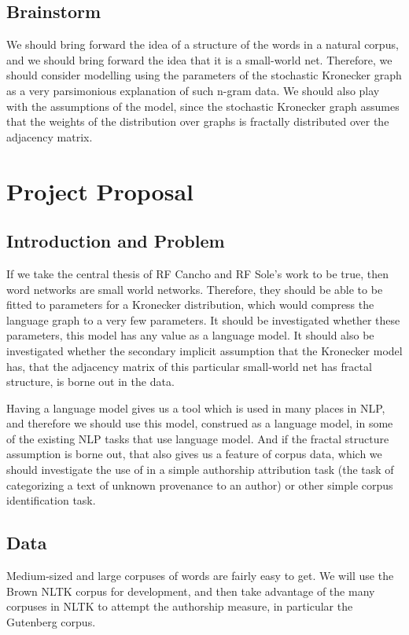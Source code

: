 \documentclass[12pt]{article}
\begin{document}
\subsection{Brainstorm}

We should bring forward the idea of a structure of the words in a natural corpus, and we should bring forward the idea that it is a small-world net. Therefore, we should consider modelling using the parameters of the stochastic Kronecker graph as a very parsimonious explanation of such n-gram data. We should also play with the assumptions of the model, since the stochastic Kronecker graph assumes that the weights of the distribution over graphs is fractally distributed over the adjacency matrix.

\section{Project Proposal}

\subsection{Introduction and Problem}
If we take the central thesis of RF Cancho and RF Sole's work to be true, then word networks are small world networks. Therefore, they should be able to be fitted to parameters for a Kronecker distribution, which would compress the language graph to a very few parameters. It should be investigated whether these parameters, this model has any value as a language model. It should also be investigated whether the secondary implicit assumption that the Kronecker model has, that the adjacency matrix of this particular small-world net has fractal structure, is borne out in the data.

Having a language model gives us a tool which is used in many places in NLP, and therefore we should use this model, construed as a language model, in some of the existing NLP tasks that use language model. And if the fractal structure assumption is borne out, that also gives us a feature of corpus data, which we should investigate the use of in a simple authorship attribution task (the task of categorizing a text of unknown provenance to an author) or other simple corpus identification task.
\subsection{Data}
Medium-sized and large corpuses of words are fairly easy to get. We will use the Brown NLTK corpus for development, and then take advantage of the many corpuses in NLTK to attempt the authorship measure, in particular the Gutenberg corpus.
\end{document}
